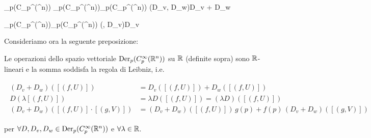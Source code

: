 \map{+}
	{\der_{p}(C_{p}^{\infty}(\R^{n})) \times \der_{p}(C_{p}^{\infty}(\R^{n}))}{\der_{p}(C_{p}^{\infty}(\R^{n}))}
	{(D_{v}, D_{w})}{D_{v} + D_{w}}
	
\map{\cdot}
	{\R \times \der_{p}(C_{p}^{\infty}(\R^{n}))}{\der_{p}(C_{p}^{\infty}(\R^{n}))}
	{(\lambda, D_{v})}{\lambda D_{v}}

Consideriamo ora la seguente preposizione:

\begin{definition}
	Le operazioni dello spazio vettoriale $ \operatorname{Der}_{p}(C_{p}^{\infty}(\mathbb{R}^{n})) $ su $ \mathbb{R} $ (definite sopra) sono $ \mathbb{R} $-lineari e la somma soddisfa la regola di Leibniz, i.e.
	
	\begin{align}
		\begin{split}
			(D_{v} + D_{w}) ([(f,U)]) &= D_{v}([(f,U)]) + D_{w}([(f,U)])\\
			D (\lambda [(f,U)]) &= \lambda D ([(f,U)]) = (\lambda D) ([(f,U)])\\
			(D_{v} + D_{w}) ([(f,U)] \cdot [(g,V)]) &= (D_{v} + D_{w}) ([(f,U)]) \, g(p) + f(p) \, (D_{v} + D_{w}) ([(g,V)])
		\end{split}
	\end{align}

	per $ \forall D, D_{v}, D_{w} \in \operatorname{Der}_{p}(C_{p}^{\infty}(\mathbb{R}^{n})) $ e $ \forall \lambda \in \mathbb{R} $.
\end{definition}

